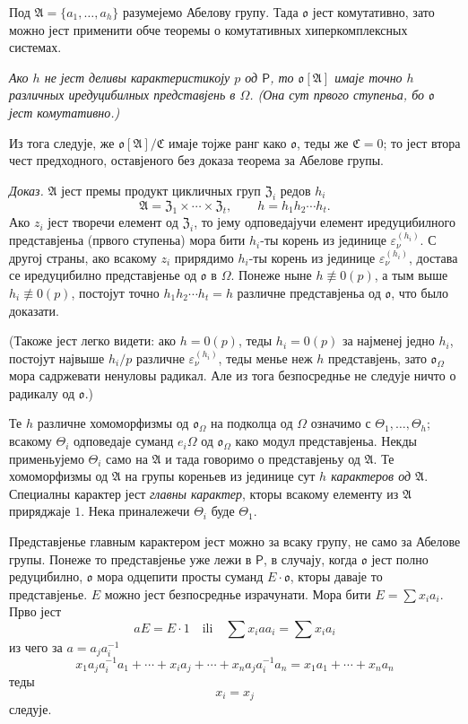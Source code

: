 \documentclass[11pt]{article}
\begin{document}
Под \(\mathfrak A=\{a_1,\ldots,a_h\}\) разумејемо Абелову групу. Тада \(\mathfrak o\) јест комутативно, зато можно јест применити обче теоремы о комутативных хиперкомплексных системах.

\emph{Ако \(h\) не јест деливы карактеристикоју \(p\) од \(\mathsf P\), то \(\mathfrak o[\mathfrak A]\) имаје точно \(h\) различных иредуцибилных представјень в \(\Omega\). (Она сут првого ступеньа, бо \(\mathfrak o\) јест комутативно.)}

Из тога следује, же \(\mathfrak o[\mathfrak A]/\mathfrak C\) имаје тојже ранг како \(\mathfrak o\), теды же \(\mathfrak C=0\); то јест втора чест предходного, оставјеного без доказа теорема за Абелове групы.

\emph{Доказ.} \(\mathfrak A\) јест премы продукт цикличных груп \(\mathfrak Z_i\) редов \(h_i\)
\[
\mathfrak A=\mathfrak Z_1\times\cdots\times\mathfrak Z_t,\qquad
h=h_1h_2\cdots h_t .
\]
Ако \(z_i\) јест творечи елемент од \(\mathfrak Z_i\), то јему одповедајучи елемент иредуцибилного представјеньа (првого ступеньа) мора бити \(h_i\)-ты корень из јединице \(\varepsilon_\nu^{(h_i)}\). С другој страны, ако всакому \(z_i\) прирядимо \(h_i\)-ты корень из јединице \(\varepsilon_\nu^{(h_i)}\), достава се иредуцибилно представјенье од \(\mathfrak o\) в \(\Omega\). Понеже ныне \(h\not\equiv0(p)\), а тым выше \(h_i\not\equiv0(p)\), постојут точно \(h_1h_2\cdots h_t=h\) различне представјеньа од \(\mathfrak o\), что было доказати.

(Такоже јест легко видети: ако \(h=0(p)\), теды \(h_i=0(p)\) за најменеј једно \(h_i\), постојут највыше \(h_i/p\) различне \(\varepsilon_\nu^{(h_i)}\), теды менье неж \(h\) представјень, зато \(\mathfrak o_\Omega\) мора садржевати ненуловы радикал. Але из тога безпосреднье не следује ничто о радикалу од \(\mathfrak o\).)

Те \(h\) различне хомоморфизмы од \(\mathfrak o_\Omega\) на подколца од \(\Omega\) означимо с \(\Theta_1,\ldots,\Theta_h\); всакому \(\Theta_i\) одповедаје суманд \(e_i\Omega\) од \(\mathfrak o_\Omega\) како модул представјеньа. Некды применьујемо \(\Theta_i\) само на \(\mathfrak A\) и тада говоримо о представјеньу од \(\mathfrak A\). Те хомоморфизмы од \(\mathfrak A\) на групы кореньев из јединице сут \emph{\(h\) карактеров од \(\mathfrak A\)}. Специалны карактер јест \emph{главны карактер}, кторы всакому елементу из \(\mathfrak A\) приряджаје \(1\). Нека приналежечи \(\Theta_i\) буде \(\Theta_1\).

Представјенье главным карактером јест можно за всаку групу, не само за Абелове групы. Понеже то представјенье уже лежи в \(\mathsf P\), в случају, когда \(\mathfrak o\) јест полно редуцибилно, \(\mathfrak o\) мора одцепити просты суманд \(E\cdot\mathfrak o\), кторы даваје то представјенье. \(E\) можно јест безпосреднье израчунати. Мора бити \(E=\sum x_i a_i\). Прво јест
\[
aE=E\cdot 1\quad\text{ili}\quad \sum x_i a a_i=\sum x_i a_i
\]
из чего за \(a=a_j a_i^{-1}\)
\[
x_1a_ja_i^{-1}a_1+\cdots+x_i a_j+\cdots+x_na_ja_i^{-1}a_n
=x_1a_1+\cdots+x_na_n
\]
теды
\[
x_i=x_j
\]
следује.
\end{document}
